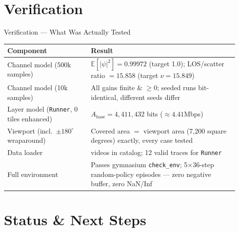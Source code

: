 \documentclass[aspectratio=169]{beamer}
\begin{document}
\section{Verification}

\begin{frame}{Verification --- What Was Actually Tested}
  \scriptsize
  \begin{tabular}{@{}>{\raggedright\arraybackslash}p{0.34\linewidth}>{\raggedright\arraybackslash}p{0.60\linewidth}@{}}
    \toprule
    \textbf{Component} & \textbf{Result} \\
    \midrule
    Channel model (500k samples) & $\mathbb{E}[|\psi|^2]=0.99972$ (target 1.0); LOS/scatter ratio $=15.858$ (target $\nu=15.849$) \\
    Channel model (10k samples) & All gains finite \& $\ge0$; seeded runs bit-identical, different seeds differ \\
    Layer model (\texttt{Runner}, 0 tiles enhanced) & $A_{\text{base}} = 4{,}411{,}432$ bits ($\approx4.41$Mbps) \\
    Viewport (incl.\ $\pm180^\circ$ wraparound) & Covered area $=$ viewport area (7{,}200 square degrees) exactly, every case tested \\
    Data loader & 15 videos in catalog; 12 valid traces for \texttt{Runner} \\
    Full environment & Passes gymnasium \texttt{check\_env}; 5$\times$36-step random-policy episodes --- zero negative buffer, zero NaN/Inf \\
    \bottomrule
  \end{tabular}
\end{frame}

\section{Status \& Next Steps}
\end{document}
